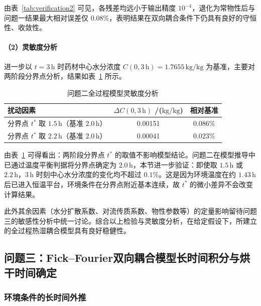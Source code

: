 \documentclass[12pt,a4paper]{article}
\begin{document}
由表~\ref{tab:verification2} 可见，各残差均远小于输出精度 \(10^{-4}\)，退化为常物性后与问题一结果最大相对误差仅 \(0.08\%\)，表明结果在双向耦合条件下仍具有良好的守恒性、收敛性。

\paragraph{（2）灵敏度分析}
进一步以 \(t=3\,\mathrm{h}\) 时药材中心水分浓度 \(C(0,3\,\mathrm{h})=1.7655\,\mathrm{kg/kg}\) 为基准，主要对两阶段分界点分析，结果如表~\ref{tab:sens_q2} 所示。

\begin{table}[htbp]
\centering
\caption{问题二全过程模型灵敏度分析}
\label{tab:sens_q2}
\renewcommand{\arraystretch}{1.15}
\begin{tabular}{lcc}
\toprule
扰动因素 & \(\Delta C(0,3\,\mathrm{h})\) /(\(\mathrm{kg/kg}\)) & 相对基准 \\
\midrule
分界点 \(t^*\) 取 \(1.5\,\mathrm{h}\)（基准 \(2.0\,\mathrm{h}\)） & 0.00151 & \(0.086\%\) \\
分界点 \(t^*\) 取 \(2.2\,\mathrm{h}\)（基准 \(2.0\,\mathrm{h}\)） & 0.00041 & \(0.023\%\) \\
\bottomrule
\end{tabular}
\end{table}

由表~\ref{tab:sens_q2} 可得看出：两阶段分界点 \(t^*\) 的取值不影响模型结论。问题二在模型推导中已通过温度平衡判据将分界点确定为 \(2.0\,\mathrm{h}\)，本节进一步验证：即使取 \(1.5\,\mathrm{h}\) 或 \(2.2\,\mathrm{h}\)，\(3\,\mathrm{h}\) 时刻中心水分浓度的变化均不超过 \(0.1\%\)。这是因为环境温度在约 \(1.43\,\mathrm{h}\) 后已进入恒温平台，环境条件在分界点附近基本连续，故 \(t^*\) 的微小差异不会改变计算结果。

此外其余因素（水分扩散系数、对流传质系数、物性参数等）的定量影响留待问题三的敏感性分析中统一讨论。综合以上检验与灵敏度分析，在给定假设下，所建立的全过程热湿耦合模型具有良好稳健性。



\subsection{问题三：Fick–Fourier双向耦合模型长时间积分与烘干时间确定}


\subsubsection{环境条件的长时间外推}
\end{document}

